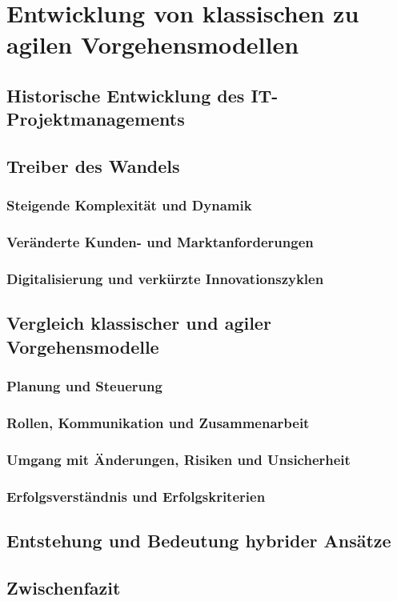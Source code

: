 \chapter{Entwicklung von klassischen zu agilen Vorgehensmodellen}
\label{sec:EntwicklungVorgehensmodelle}

\section{Historische Entwicklung des IT-Projektmanagements}
\label{sec:HistorischeEntwicklung}

\section{Treiber des Wandels}
\label{sec:TreiberDesWandels}

\subsection{Steigende Komplexität und Dynamik}
\subsection{Veränderte Kunden- und Marktanforderungen}
\subsection{Digitalisierung und verkürzte Innovationszyklen}

\section{Vergleich klassischer und agiler Vorgehensmodelle}
\label{sec:VergleichVorgehensmodelle}

\subsection{Planung und Steuerung}
\subsection{Rollen, Kommunikation und Zusammenarbeit}
\subsection{Umgang mit Änderungen, Risiken und Unsicherheit}
\subsection{Erfolgsverständnis und Erfolgskriterien}

\section{Entstehung und Bedeutung hybrider Ansätze}
\label{sec:EntstehungHybriderAnsaetze}

\section{Zwischenfazit}
\label{sec:ZwischenfazitEntwicklung}
